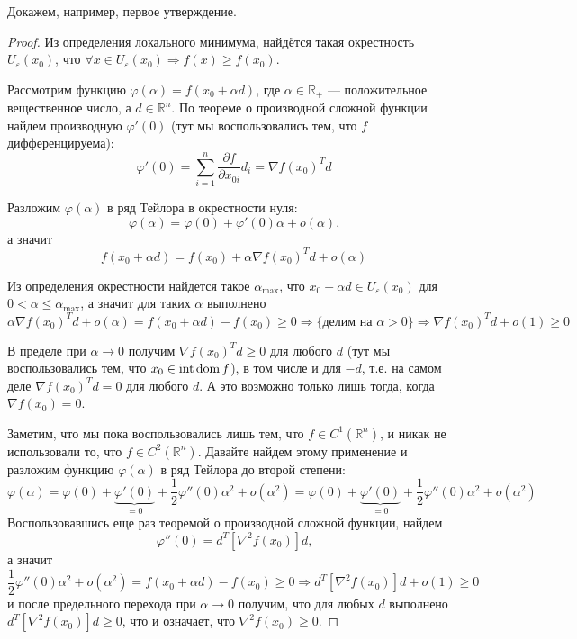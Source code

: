 \documentclass[a4paper, 12pt]{article}
\begin{document}
Докажем, например, первое утверждение.
\begin{proof}
Из определения локального минимума, найдётся такая окрестность $U_{\varepsilon}(x_0)$, что $\forall x \in U_{\varepsilon}(x_0) \Rightarrow f(x) \geq f(x_0)$.

Рассмотрим функцию $\varphi(\alpha) = f(x_0 + \alpha d)$, где $\alpha \in \mathbb{R}_{+}$ --- положительное вещественное число, а $d \in \mathbb{R}^n$. По теореме о производной сложной функции найдем производную $\varphi'(0)$ (тут мы воспользовались тем, что $f$ дифференцируема):
$$\varphi'(0) = \sum_{i=1}^{n} \frac{\partial f}{\partial x_{0i}} d_i = \nabla f(x_0)^T d$$

Разложим $\varphi(\alpha)$ в ряд Тейлора в окрестности нуля: $$\varphi(\alpha) = \varphi(0) + \varphi'(0) \alpha + o(\alpha)\text{,}$$
а значит
$$f(x_0 + \alpha d) = f(x_0) + \alpha \nabla f(x_0)^T d + o(\alpha)$$

Из определения окрестности найдется такое $\alpha_{\text{max}}$, что $x_0 + \alpha d \in U_{\varepsilon}(x_0)$ для $0 < \alpha \leq \alpha_{\text{max}}$, а значит для таких $\alpha$ выполнено
$$\alpha \nabla f(x_0)^T d + o(\alpha) = f(x_0 + \alpha d) - f(x_0) \geq 0 \Rightarrow \text{\{делим на $\alpha > 0$\}} \Rightarrow \nabla f(x_0)^T d + o(1) \geq 0$$

В пределе при $\alpha \rightarrow 0$ получим $\nabla f(x_0)^T d  \geq 0$ для любого $d$ (тут мы воспользовались тем, что $x_0 \in \operatorname{\mathop{int}} \operatorname{\mathop{dom}} f$), в том числе и для $-d$, т.е. на самом деле $\nabla f(x_0)^T d = 0$ для любого $d$. А это возможно только лишь тогда, когда $\nabla f(x_0) = 0$.

Заметим, что мы пока воспользовались лишь тем, что $f \in C^1(\mathbb{R}^n)$, и никак не использовали то, что $f \in C^2(\mathbb{R}^n)$. Давайте найдем этому применение и разложим функцию $\varphi(\alpha)$ в ряд Тейлора до второй степени:
$$\varphi(\alpha) = \varphi(0) + \underbrace{\varphi'(0)}_{=0} + \frac{1}{2}\varphi''(0) \alpha^2 + o(\alpha^2) = \varphi(0) + \underbrace{\varphi'(0)}_{=0} + \frac{1}{2}\varphi''(0) \alpha^2 + o(\alpha^2)$$
Воспользовавшись еще раз теоремой о производной сложной функции, найдем 
$$\varphi''(0) = d^T \left[ \nabla^2 f(x_0) \right]d\text{,}$$
а значит
$$\frac{1}{2}\varphi''(0) \alpha^2 + o(\alpha^2) = f(x_0 + \alpha d) - f(x_0) \geq 0 \Rightarrow d^T \left[ \nabla^2 f(x_0) \right]d + o(1) \geq 0$$
и после предельного перехода при $\alpha \rightarrow 0$ получим, что для любых $d$ выполнено $d^T \left[ \nabla^2 f(x_0) \right]d \geq 0$, что и означает, что $\nabla^2 f(x_0) \geq 0$.

\end{proof}
\end{document}
